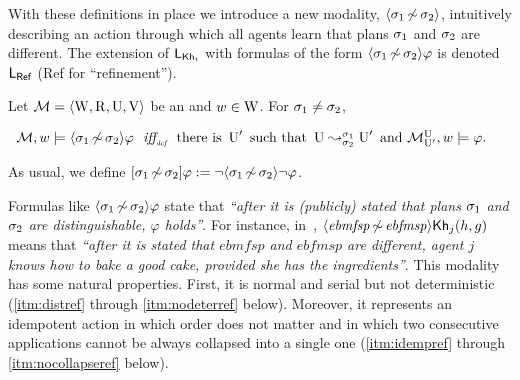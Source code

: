 \medskip

With these definitions in place we introduce a new modality, $\langle \sigma_1{\,\not\sim\,}\sigma_2 \rangle$, intuitively describing an action through which all agents learn that plans $\sigma_1$ and
$\sigma_2$ are different. The extension of $\mathsf{L}_{{\sf Kh}_i}$ with formulas of the form $\langle \sigma_1{\,\not\sim\,}\sigma_2 \rangle\varphi$ is denoted $\mathsf{L_{Ref}}$ ({\small\textsf{Ref}} for ``refinement'').

\medskip

\begin{definition}\label{def:ref-sem}
Let $\mathcal{M}=\langle \operatorname{W},\operatorname{R},\operatorname{U},\operatorname{V} \rangle$ be an \ults and $w \in \operatorname{W}$.
For $\sigma_1\neq\sigma_2$,
\begin{spcenter}
$\begin{array}{l@{\ \ }c@{\ \ }l}
\modults,w\models \refdiam{\plan_1}{\plan_2}\varphi & \iffdef & \text{there is } \Unc' \text{ such that } \splitstr{\Unc}{\Unc'}{\plan_1}{\plan_2} \text{ and }  \modults^{\Unc}_{\Unc'},w \models \varphi.
\end{array}$
\end{spcenter}
As usual, we define $[{\sigma_1{\,\not\sim\,}\sigma_2}]\varphi := \lnot \langle \sigma_1{\,\not\sim\,}\sigma_2 \rangle\lnot\varphi$.
\end{definition}

\medskip

Formulas like $\langle \sigma_1{\,\not\sim\,}\sigma_2 \rangle\varphi$ state that \emph{``after it is (publicly) stated that plans $\sigma_1$ and $\sigma_2$ are distinguishable, $\varphi$ holds''}. For instance, in~, $\langle \mathit{ebmfsp}{\,\not\sim\,}\mathit{ebfmsp} \rangle{\sf Kh}_j(h,g)$ means that \emph{``after it is stated that $\mathit{ebmfsp}$ and $\mathit{ebfmsp}$ are different, agent $j$ knows how to bake a good cake, provided she has the ingredients''}. This modality has some natural properties. First, it is normal and serial but not deterministic (\ref{itm:distref} through \ref{itm:nodeterref} below). Moreover, it represents an idempotent action in which order does not matter and in which two consecutive applications cannot be always collapsed into a single one (\ref{itm:idempref} through \ref{itm:nocollapseref} below). 

\medskip

